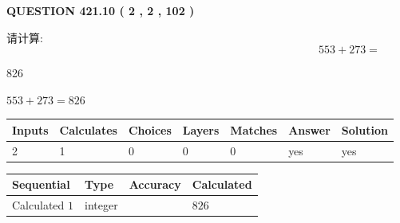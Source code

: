 \documentclass{ctexart}
\begin{document}
   
  
\vspace{0.2in}
  
{\textbf{\Large{QUESTION
421.10 
 ( 2 , 2 , 102 )
}}}
  
  
 
请计算:
\begin{equation}
553 +  %
273 = \nonumber
\end{equation}
 
 
 
\noindent{}
 
 

826
 
 
\noindent{}
 
 

 
 
 
\noindent{}
 
 

$ %
553 +  %
273=   %
826$
 
 
\noindent{}
 
 

 
   
   
   
   
\noindent\begin{tabular}{|l|l|l|l|l|l|l|}
 \hline
Inputs & Calculates & Choices & Layers & Matches & Answer & Solution \\ \hline
 2  & 
 1  & 
 0
  & 
 0  & 
 0  & 
  yes & 
  yes 
  \\ \hline
 \end{tabular}
   
   
   
   
\noindent{}
   
   
  
  
\noindent\begin{tabular}{|l|l|l|l|}
\hline
 Sequential & Type & Accuracy & Calculated \\ 
\hline
 
 
  Calculated $  1 $ & integer &  & 
  $ 826 $ 
 \\  \hline  
 \end{tabular}
   
\end{document}
